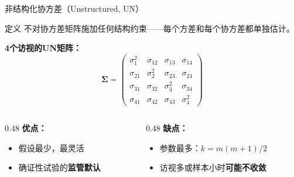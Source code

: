 \documentclass[aspectratio=169,11pt]{beamer}
\newcommand{\bSigma}{\boldsymbol{\Sigma}}
\begin{document}
\begin{frame}{非结构化协方差（Unstructured, UN）}
\begin{block}{定义}
不对协方差矩阵施加任何结构约束——每个方差和每个协方差都单独估计。
\end{block}

\vspace{0.1cm}
\textbf{4个访视的UN矩阵：}
\vspace{-0.2cm}
\[
\bSigma = \begin{pmatrix}
\sigma_1^2 & \sigma_{12} & \sigma_{13} & \sigma_{14} \\
\sigma_{21} & \sigma_2^2 & \sigma_{23} & \sigma_{24} \\
\sigma_{31} & \sigma_{32} & \sigma_3^2 & \sigma_{34} \\
\sigma_{41} & \sigma_{42} & \sigma_{43} & \sigma_4^2
\end{pmatrix}
\]

\vspace{-0.1cm}
\begin{columns}[T,totalwidth=\textwidth]
\begin{column}{0.48\textwidth}
\textbf{优点：}
\begin{itemize}
    \item 假设最少，最灵活
    \item 确证性试验的\textbf{监管默认}
\end{itemize}
\end{column}
\begin{column}{0.48\textwidth}
\textbf{缺点：}
\begin{itemize}
    \item 参数最多：$k = m(m+1)/2$
    \item 访视多或样本小时\textbf{可能不收敛}
\end{itemize}
\end{column}
\end{columns}
\end{frame}
\end{document}
